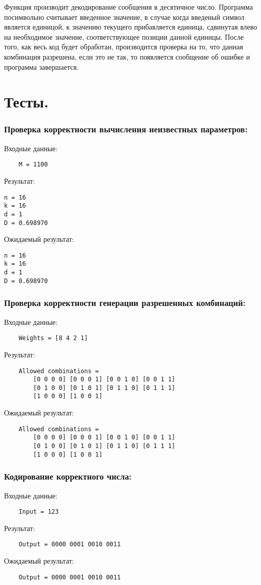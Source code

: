 \documentclass[12pt, a4paper]{report}
\begin{document}
Функция производит декодирование сообщения в десятичное число. Программа посимвольно считывает введенное значение, в случае когда введеный символ является единицой, к значению текущего прибавляется единица, сдвинутая влево на необходимое значение, соответствующее позиции данной единицы. После того, как весь код будет обработан, производится проверка на то, что данная комбинация разрешена, если это не так, то появляется сообщение об ошибке и программа завершается.

\newpage

\section*{Тесты.}

\subsubsection*{Проверка корректности вычисления неизвестных параметров:}
Входные данные:
\begin{lstlisting}
	M = 1100
\end{lstlisting}
Результат:
\begin{lstlisting}
n = 16
k = 16
d = 1
D = 0.698970
\end{lstlisting}
Ожидаемый результат:
\begin{lstlisting}
n = 16
k = 16
d = 1
D = 0.698970
\end{lstlisting}
\subsubsection*{Проверка корректности генерации разрешенных комбинаций:}
Входные данные:
\begin{lstlisting}
	Weights = [8 4 2 1]
\end{lstlisting}
Результат:
\begin{lstlisting}
	Allowed combinations = 
		[0 0 0 0] [0 0 0 1] [0 0 1 0] [0 0 1 1] 
		[0 1 0 0] [0 1 0 1] [0 1 1 0] [0 1 1 1]
		[1 0 0 0] [1 0 0 1]
\end{lstlisting}
Ожидаемый результат:
\begin{lstlisting}
	Allowed combinations = 
		[0 0 0 0] [0 0 0 1] [0 0 1 0] [0 0 1 1] 
		[0 1 0 0] [0 1 0 1] [0 1 1 0] [0 1 1 1]
		[1 0 0 0] [1 0 0 1]
\end{lstlisting}
\newpage
\subsubsection*{Кодирование корректного числа:}
Входные данные:
\begin{lstlisting}
	Input = 123
\end{lstlisting}
Результат:
\begin{lstlisting}
	Output = 0000 0001 0010 0011
\end{lstlisting}
Ожидаемый результат:
\begin{lstlisting}
	Output = 0000 0001 0010 0011
\end{lstlisting}
\end{document}
